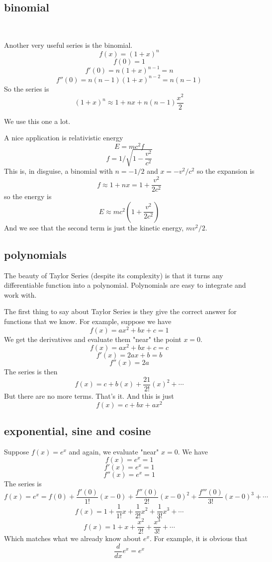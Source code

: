 \documentclass[11pt, oneside]{article}
\begin{document}
\subsection*{binomial}\

Another very useful series is the binomial.
\[ f(x) = (1 + x)^n \]
\[ f(0) = 1 \]
\[ f'(0) = n(1 + x)^{n-1} = n \]
\[ f''(0) = n(n-1)(1 + x)^{n-2} = n(n-1) \]
So the series is
\[ (1 + x)^n \approx 1 + nx + n(n-1) \frac{x^2}{2} \]

We use this one a lot.

A nice application is relativistic energy
\[ E = mc^2 f \]
\[ f =  1/\sqrt{1-\frac{v^2}{c^2}} \]
This is, in disguise, a binomial with $n=-1/2$ and $x=-v^2/c^2$ so the expansion is
\[ f  \approx 1 + nx = 1 + \frac{v^2}{2c^2} \]
so the energy is 
\[ E \approx mc^2 (1 + \frac{v^2}{2c^2} ) \]
And we see that the second term is just the kinetic energy, $mv^2/2$.

\subsection*{polynomials}

The beauty of Taylor Series (despite its complexity) is that it turns any differentiable function into a polynomial.  Polynomials are easy to integrate and work with.

The first thing to say about Taylor Series is they give the correct answer for functions that we know.  For example, suppose we have 
\[ f(x) = ax^2 + bx + c = 1 \]
We get the derivatives and evaluate them "near" the point $x=0$.
\[ f(x) = ax^2 + bx + c = c \]
\[ f'(x) = 2ax + b = b \]
\[ f''(x) = 2a \]
The series is then
\[ f(x) = c + b(x) + \frac{21}{2!}(x)^2 + \cdots \]
But there are no more terms.  That's it.  And this is just
\[ f(x) = c + bx + ax^2 \]

\subsection*{exponential, sine and cosine}

Suppose $f(x) = e^x$ and again, we evaluate "near" $x=0$.  We have
\[ f(x) = e^x = 1 \]
\[ f'(x) = e^x = 1 \]
\[ f''(x) = e^x = 1 \]
The series is
\[ f(x) = e^x = f(0) + \frac{f'(0)}{1!}(x-0) + \frac{f''(0)}{2!}(x-0)^2 + \frac{f'''(0)}{3!}(x-0)^3 + \cdots \]
\[ f(x) = 1 + \frac{1}{1!}x + \frac{1}{2!}x^2 + \frac{1}{3!}x^3 + \cdots \]
\[ f(x) = 1 + x + \frac{x^2}{2!} + \frac{x^3}{3!} + \cdots \]
Which matches what we already know about $e^x$.  For example, it is obvious that 
\[ \frac{d}{dx}e^x = e^x \]
\end{document}

